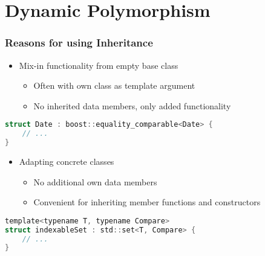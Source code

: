 
\section{Dynamic Polymorphism}

\subsubsection{Reasons for using Inheritance}
\begin{itemize}
    \item Mix-in functionality from empty base class
    \begin{itemize}
        \item Often with own class as template argument
        \item No inherited data members, only added functionality
    \end{itemize}
\end{itemize}
\begin{lstlisting}[style=frame, style= linenumbers, language=C]
struct Date : boost::equality_comparable<Date> {
    // ...
}
\end{lstlisting}

\vspace{1em}

\begin{itemize}
    \item Adapting concrete classes
    \begin{itemize}
        \item No additional own data members
        \item Convenient for inheriting member functions and constructors
    \end{itemize}
\end{itemize}
\begin{lstlisting}[style=frame, style= linenumbers, language=C]
template<typename T, typename Compare>
struct indexableSet : std::set<T, Compare> {
    // ...
}
\end{lstlisting}

